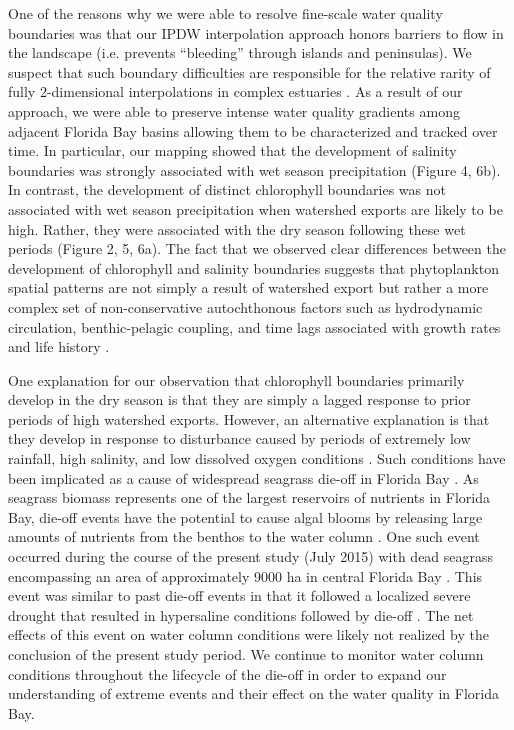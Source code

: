 \documentclass[review]{elsarticle}
\begin{document}
One of the reasons why we were able to resolve fine-scale water quality boundaries was that our IPDW interpolation approach honors barriers to flow in the landscape (i.e. prevents “bleeding” through islands and peninsulas). We suspect that such boundary difficulties are responsible for the relative rarity of fully 2-dimensional interpolations in complex estuaries \citep{lane_effects_2007, roman2005seasonal}. As a result of our approach, we were able to preserve intense water quality gradients among adjacent Florida Bay basins allowing them to be characterized and tracked over time. In particular, our mapping showed that the development of salinity boundaries was strongly associated with wet season precipitation (Figure 4, 6b). In contrast, the development of distinct chlorophyll boundaries was not associated with wet season precipitation when watershed exports are likely to be high. Rather, they were associated with the dry season following these wet periods (Figure 2, 5, 6a). The fact that we observed clear differences between the development of chlorophyll and salinity boundaries suggests that phytoplankton spatial patterns are not simply a result of watershed export but rather a more complex set of non-conservative autochthonous factors such as hydrodynamic circulation, benthic-pelagic coupling, and time lags associated with growth rates and life history \citep[Figure 6;][]{zhang_2014, lawrence2004wind}.

One explanation for our observation that chlorophyll boundaries primarily develop in the dry season is that they are simply a lagged response to prior periods of high watershed exports. However, an alternative explanation is that they develop in response to disturbance caused by periods of extremely low rainfall, high salinity, and low dissolved oxygen conditions \citep{hall2016recurrence}. Such conditions have been implicated as a cause of widespread seagrass die-off in Florida Bay \citep{borum2005potential, zieman1999seagrass}. As seagrass biomass represents one of the largest reservoirs of nutrients in Florida Bay, die-off events have the potential to cause algal blooms by releasing large amounts of nutrients from the benthos to the water column \citep{fourqurean2012carbon, zhang2004potential}. One such event occurred during the course of the present study (July 2015) with dead seagrass encompassing an area of approximately 9000 ha in central Florida Bay \citep{hall2016recurrence}. This event was similar to past die-off events in that it followed a localized severe drought that resulted in hypersaline conditions followed by die-off \citep[Figure 4;][]{robblee1991mass}. The net effects of this event on water column conditions were likely not realized by the conclusion of the present study period. We continue to monitor water column conditions throughout the lifecycle of the die-off in order to expand our understanding of extreme events and their effect on the water quality in Florida Bay.
\end{document}
